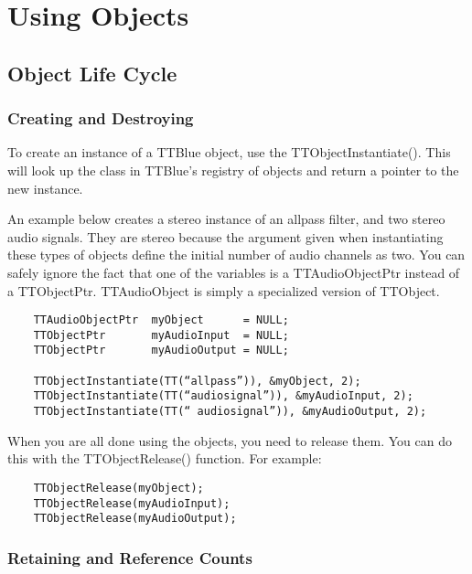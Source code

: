\chapter{Using Objects}


\section{Object Life Cycle}

\subsection{Creating and Destroying}

To create an instance of a TTBlue object, use the TTObjectInstantiate().  
This will look up the class in TTBlue’s registry of objects and return a pointer to the new instance. 
 
An example below creates a stereo instance of an allpass filter, and two stereo audio signals.
They are stereo because the argument given when instantiating these types of objects define the initial number of audio channels as two.
You can safely ignore the fact that one of the variables is a TTAudioObjectPtr instead of a TTObjectPtr.  
TTAudioObject is simply a specialized version of TTObject.

\begin{small}\begin{verbatim}
	TTAudioObjectPtr  myObject      = NULL;
	TTObjectPtr       myAudioInput  = NULL;
	TTObjectPtr       myAudioOutput = NULL;

	TTObjectInstantiate(TT(“allpass”)), &myObject, 2);
	TTObjectInstantiate(TT(“audiosignal”)), &myAudioInput, 2);
	TTObjectInstantiate(TT(“ audiosignal”)), &myAudioOutput, 2);
\end{verbatim}\end{small}

When you are all done using the objects, you need to release them.  
You can do this with the TTObjectRelease() function.  
For example:

\begin{small}\begin{verbatim}
	TTObjectRelease(myObject);
	TTObjectRelease(myAudioInput);
	TTObjectRelease(myAudioOutput);
\end{verbatim}\end{small}


\subsection{Retaining and Reference Counts}

